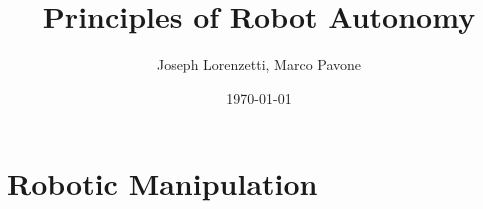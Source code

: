 \documentclass[nohyper,nobib]{tufte-book}
\title{Principles of Robot Autonomy}
\author{Joseph Lorenzetti, Marco Pavone}
\date{\today}
\begin{document}
\chapter{Robotic Manipulation}


\printbibliography
\end{document}
